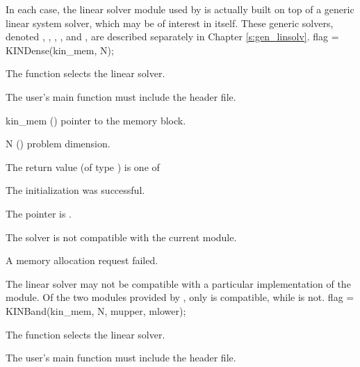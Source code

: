 In each case, the linear solver module used by {\kinsol} is actually built
on top of a generic linear system solver, which may be of interest in itself.
These generic solvers, denoted {\dense}, {\band}, {\spgmr}, {\spbcg}, and {\sptfqmr},
are described separately in Chapter \ref{s:gen_linsolv}.
{
  flag = KINDense(kin\_mem, N);
}
{
  The function  selects the {\kindense} linear solver. 

  The user's main function must include the  header file.
}
{
  \begin{args}
  \item[kin\_mem] ()
    pointer to the {\kinsol} memory block.
  \item[N] ()
    problem dimension.
  \end{args}
}
{
  The return value  (of type ) is one of
  \begin{args}
  \item[\Id{KINDENSE\_SUCCESS}] 
    The {\kindense} initialization was successful.
  \item[\Id{KINDENSE\_MEM\_NULL}]
    The  pointer is .
  \item[\Id{KINDENSE\_ILL\_INPUT}]
    The {\kindense} solver is not compatible with the current {\nvector} module.
  \item[\Id{KINDENSE\_MEM\_FAIL}]
    A memory allocation request failed.
  \end{args}
}
{
  The {\kindense} linear solver may not be compatible with a particular
  implementation of the {\nvector} module. 
  Of the two {\nvector} modules provided by {\sundials}, only {\nvecs} is 
  compatible, while {\nvecp} is not.
}
{
  flag = KINBand(kin\_mem, N, mupper, mlower);
}
{
  The function  selects the {\kinband} linear solver. 

  The user's main function must include the  header file.
}
